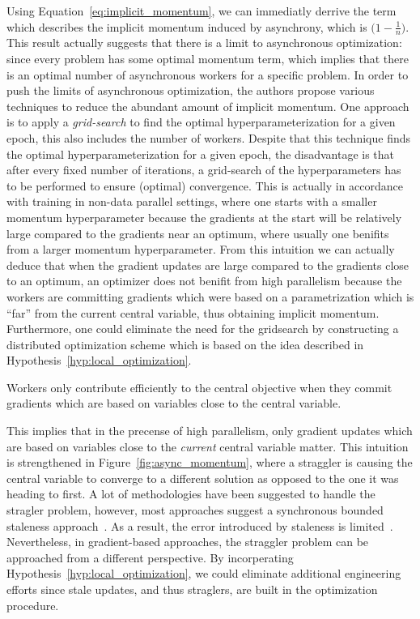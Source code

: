 Using Equation~\ref{eq:implicit_momentum}, we can immediatly derrive the term which describes the implicit momentum induced by asynchrony, which is $\big(1 - \frac{1}{n}\big)$. This result actually suggests that there is a limit to asynchronous optimization: since every problem has some optimal momentum term, which implies that there is an optimal number of asynchronous workers for a specific problem. In order to push the limits of asynchronous optimization, the authors propose various techniques to reduce the abundant amount of implicit momentum. One approach is to apply a \emph{grid-search} to find the optimal hyperparameterization for a given epoch, this also includes the number of workers. Despite that this technique finds the optimal hyperparameterization for a given epoch, the disadvantage is that after every fixed number of iterations, a grid-search of the hyperparameters has to be performed to ensure (optimal) convergence. This is actually in accordance with training in non-data parallel settings, where one starts with a smaller momentum hyperparameter because the gradients at the start will be relatively large compared to the gradients near an optimum, where usually one benifits from a larger momentum hyperparameter. From this intuition we can actually deduce that when the gradient updates are large compared to the gradients close to an optimum, an optimizer does not benifit from high parallelism because the workers are committing gradients which were based on a parametrization which is ``far'' from the current central variable, thus obtaining implicit momentum. Furthermore, one could eliminate the need for the gridsearch by constructing a distributed optimization scheme which is based on the idea described in Hypothesis~\ref{hyp:local_optimization}.

\begin{hyp} \label{hyp:local_optimization}
  Workers only contribute efficiently to the central objective when they commit gradients which are based on variables close to the central variable.
\end{hyp}

This implies that in the precense of high parallelism, only gradient updates which are based on variables close to the \emph{current} central variable matter. This intuition is strengthened in Figure~\ref{fig:async_momentum}, where a straggler is causing the central variable to converge to a different solution as opposed to the one it was heading to first. A lot of methodologies have been suggested to handle the stragler problem, however, most approaches suggest a synchronous bounded staleness approach~\cite{cipar2013solving, ho2013more}. As a result, the error introduced by staleness is limited~\cite{ho2013more}. Nevertheless, in gradient-based approaches, the straggler problem can be approached from a different perspective. By incorperating Hypothesis~\ref{hyp:local_optimization}, we could eliminate additional engineering efforts since stale updates, and thus straglers, are built in the optimization procedure.


